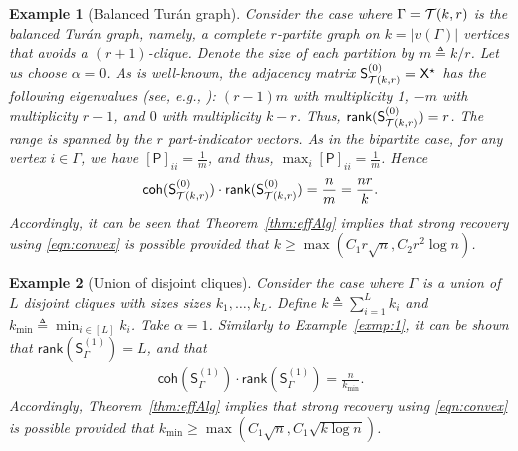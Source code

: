\documentclass[12pt]{article}
\newtheorem{example}{Example}
\newcommand{\calT}{{\cal T}}
\newcommand{\s}[1]{\mathsf{#1}}
\begin{document}
\begin{example}[Balanced Tur\'{a}n graph]
Consider the case where $\Gamma=\calT(k,r)$ is the balanced Tur\'{a}n graph, namely, a complete $r$-partite graph on $k=|v(\Gamma)|$ vertices that avoids a $(r+1)$-clique. Denote the size of each partition by $m\triangleq k/r$. Let us choose $\alpha=0$. As is well-known, the adjacency matrix $\s{S}_{\calT(k,r)}^{(0)} = \s{X}^\star$ has the following eigenvalues (see, e.g., \cite{nikiforov2017norms}): $(r-1)m$ with multiplicity 1, $-m$ with multiplicity $r-1$, and $0$ with multiplicity $k - r$. Thus, $\s{rank}(\s{S}_{\calT(k,r)}^{(0)})=r$. The range is spanned by the $r$ part-indicator vectors. As in the bipartite case, for any vertex $i\in\Gamma$, we have $[\s{P}]_{ii}=\frac{1}{m}$, and thus, $\max_i[\s{P}]_{ii}=\frac{1}{m}$. Hence
\begin{align}
\s{coh}(\s{S}_{\calT(k,r)}^{(0)})\cdot\s{rank}(\s{S}_{\calT(k,r)}^{(0)})=\frac{n}{m}=\frac{nr}{k}.
\end{align}
Accordingly, it can be seen that Theorem~\ref{thm:effAlg} implies that strong recovery using \eqref{eqn:convex} is possible provided that $k\geq \max(C_1r\sqrt{n},C_2r^2\log n)$. 
\end{example}

\begin{example}[Union of disjoint cliques]
Consider the case where $\Gamma$ is a union of $L$ disjoint cliques with sizes sizes $k_1,\dots,k_L$. Define $k\triangleq \sum_{i=1}^L k_i$ and $k_{\min}\triangleq \min_{i\in[L]} k_i$. Take $\alpha=1$. Similarly to Example~\ref{exmp:1}, it can be shown that $\s{rank}(\s{S}_{\Gamma}^{(1)})=L$, and that 
\begin{align}
\s{coh}(\s{S}_{\Gamma}^{(1)})\cdot\s{rank}(\s{S}_{\Gamma}^{(1)})=\frac{n}{k_{\min}}.
\end{align}
Accordingly, Theorem~\ref{thm:effAlg} implies that strong recovery using \eqref{eqn:convex} is possible provided that $k_{\min}\geq \max(C_1\sqrt{n},C_1\sqrt{k\log n})$.
\end{example}
\end{document}
